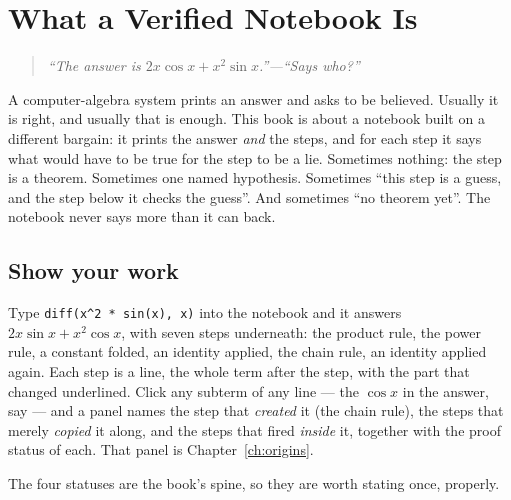 \chapter{What a Verified Notebook Is}\label{ch:what}

\begin{quote}\itshape
``The answer is $2x\cos x + x^2\sin x$.''\;---\;``Says who?''
\end{quote}

A computer-algebra system prints an answer and asks to be believed. Usually it is right, and
usually that is enough. This book is about a notebook built on a different bargain: it prints the
answer \emph{and} the steps, and for each step it says what would have to be true for the step
to be a lie. Sometimes nothing: the step is a theorem. Sometimes one named hypothesis. Sometimes
``this step is a guess, and the step below it checks the guess''. And sometimes ``no theorem yet''.
The notebook never says more than it can back.

\section{Show your work}

Type \texttt{diff(x\^{}2 * sin(x), x)} into the notebook and it answers
$2x\sin x + x^2\cos x$, with seven steps underneath: the product rule, the power rule, a constant
folded, an identity applied, the chain rule, an identity applied again. Each step is a line, the
whole term after the step, with the part that changed underlined. Click any subterm of any line
--- the $\cos x$ in the answer, say --- and a panel names the step that \emph{created} it (the
chain rule), the steps that merely \emph{copied} it along, and the steps that fired \emph{inside}
it, together with the proof status of each. That panel is Chapter~\ref{ch:origins}.

The four statuses are the book's spine, so they are worth stating once, properly.

